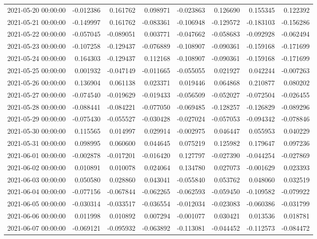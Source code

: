 \begin{tabular}{lrrrrrrr}
2021-05-20 00:00:00 & -0.012386 & 0.161762 & 0.098971 & -0.023863 & 0.126690 & 0.155345 & 0.122392 \\
2021-05-21 00:00:00 & -0.149997 & 0.161762 & -0.083361 & -0.106948 & -0.129572 & -0.183103 & -0.156286 \\
2021-05-22 00:00:00 & -0.057045 & -0.089051 & 0.003771 & -0.047662 & -0.058683 & -0.092928 & -0.062494 \\
2021-05-23 00:00:00 & -0.107258 & -0.129437 & -0.076889 & -0.108907 & -0.090361 & -0.159168 & -0.171699 \\
2021-05-24 00:00:00 & 0.164303 & -0.129437 & 0.112168 & -0.108907 & -0.090361 & -0.159168 & -0.171699 \\
2021-05-25 00:00:00 & 0.001932 & -0.047149 & -0.011665 & -0.055055 & 0.021927 & 0.042244 & -0.007263 \\
2021-05-26 00:00:00 & 0.136904 & 0.061138 & 0.023371 & 0.019446 & 0.064868 & 0.210877 & 0.080202 \\
2021-05-27 00:00:00 & -0.074540 & -0.019629 & -0.019433 & -0.056509 & -0.052027 & -0.072504 & -0.026455 \\
2021-05-28 00:00:00 & -0.088441 & -0.084221 & -0.077050 & -0.069485 & -0.128257 & -0.126829 & -0.089296 \\
2021-05-29 00:00:00 & -0.075430 & -0.055527 & -0.030428 & -0.027024 & -0.057053 & -0.094342 & -0.078846 \\
2021-05-30 00:00:00 & 0.115565 & 0.014997 & 0.029914 & -0.002975 & 0.046447 & 0.055953 & 0.040229 \\
2021-05-31 00:00:00 & 0.098995 & 0.060600 & 0.044645 & 0.075219 & 0.125982 & 0.179647 & 0.097236 \\
2021-06-01 00:00:00 & -0.002878 & -0.017201 & -0.016420 & 0.127797 & -0.027390 & -0.044254 & -0.027869 \\
2021-06-02 00:00:00 & 0.010891 & 0.010078 & 0.024064 & 0.134780 & 0.027073 & -0.001629 & 0.023393 \\
2021-06-03 00:00:00 & 0.050580 & 0.028860 & 0.043041 & -0.055840 & 0.053762 & 0.048060 & 0.032519 \\
2021-06-04 00:00:00 & -0.077156 & -0.067844 & -0.062265 & -0.062593 & -0.059450 & -0.109582 & -0.079922 \\
2021-06-05 00:00:00 & -0.030314 & -0.033517 & -0.036554 & -0.012034 & -0.023083 & -0.060386 & -0.031799 \\
2021-06-06 00:00:00 & 0.011998 & 0.010892 & 0.007294 & -0.001077 & 0.030421 & 0.013536 & 0.018781 \\
2021-06-07 00:00:00 & -0.069121 & -0.095932 & -0.063892 & -0.113081 & -0.044452 & -0.112573 & -0.084472 \\

\end{tabular}
